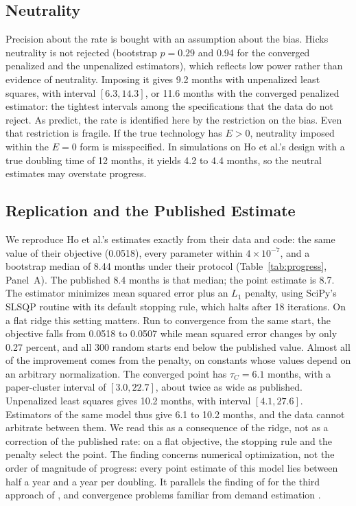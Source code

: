 \documentclass[AER,finalmode]{AEA}
\theoremstyle{definition}
\theoremstyle{remark}
\begin{document}
\subsection{Neutrality}

Precision about the rate is bought with an assumption about the bias. Hicks neutrality is not rejected (bootstrap
$p=0.29$ and 0.94 for the converged penalized and the unpenalized estimators), which reflects low power rather than
evidence of neutrality. Imposing it gives 9.2 months with unpenalized least squares, with interval $[6.3,14.3]$, or 11.6
months with the converged penalized estimator: the tightest intervals among the specifications that the data do not
reject. As \citet{diamond1978measurement} predict, the rate is identified here by the restriction on the bias. Even
that restriction is fragile. If the true technology has $E>0$, neutrality imposed within the $E=0$ form is
misspecified. In simulations on Ho et al.'s design with a true doubling time of 12 months, it yields 4.2 to 4.4 months,
so the neutral estimates may overstate progress.



\subsection{Replication and the Published Estimate}

We reproduce Ho et al.'s estimates exactly from their data and code: the same value of their objective (0.0518), every
parameter within $4\times10^{-7}$, and a bootstrap median of 8.44 months under their protocol
(Table~\ref{tab:progress}, Panel~A). The published 8.4 months is that median; the point estimate is 8.7. The estimator
minimizes mean squared error plus an $L_1$ penalty, using SciPy's SLSQP routine with its default stopping rule, which
halts after 18 iterations. On a flat ridge this setting matters. Run to convergence from the same start, the objective
falls from 0.0518 to 0.0507 while mean squared error changes by only 0.27 percent, and all 300 random starts end below
the published value. Almost all of the improvement comes from the penalty, on constants whose values depend on an
arbitrary normalization. The converged point has $\tau_C=6.1$ months, with a paper-cluster interval of $[3.0,22.7]$,
about twice as wide as published. Unpenalized least squares gives 10.2 months, with interval $[4.1,27.6]$. Estimators of
the same model thus give 6.1 to 10.2 months, and the data cannot arbitrate between them. We read this as a consequence
of the ridge, not as a correction of the published rate: on a flat objective, the stopping rule and the penalty select
the point. The finding concerns numerical optimization, not the order of magnitude of progress: every point estimate of this
model lies between half a year and a year per doubling. It parallels the finding of \citet{besiroglu2024chinchilla} for the
third approach of \citet{hoffmann2022training}, and convergence problems familiar from demand estimation
\citep{dube2012improving,knittel2014estimation}.
\end{document}
